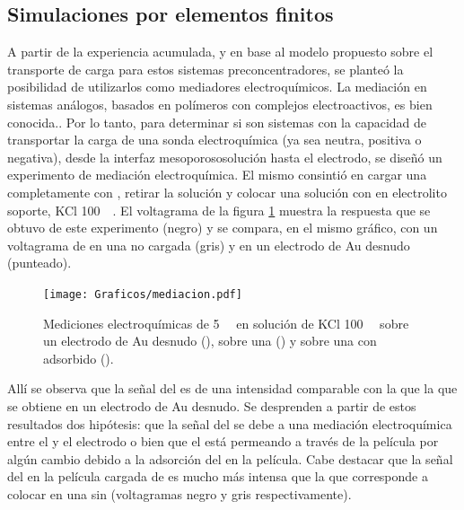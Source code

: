 	\subsection{Simulaciones por elementos finitos}	

		A partir de la experiencia acumulada, y en base al modelo propuesto sobre el transporte de carga para estos sistemas preconcentradores, se planteó la posibilidad de utilizarlos como mediadores electroquímicos. 
    	La mediación en sistemas análogos, basados en polímeros con complejos electroactivos, es bien conocida.\cite{Kolb1993,ybarra2005}. Por lo tanto, para determinar si son sistemas con la capacidad de transportar la carga de una sonda electroquímica (ya sea neutra, positiva o negativa), desde la interfaz mesoporoso\textbar solución hasta el electrodo, se diseñó un experimento de mediación electroquímica. El mismo consintió en cargar una \pdmF\space completamente con \ru, retirar la solución y colocar una solución con \fc\space en electrolito soporte, KCl \SI{100}{\milli\Molar}. El voltagrama de la figura \ref{fig:mediacion} muestra la respuesta que se obtuvo de este experimento (negro) y se compara, en el mismo gráfico, con un voltagrama de \fc\space en una \pdmF\space no cargada (gris) y en un electrodo de Au desnudo (punteado).  

        	\begin{figure}[th!]	
					\centering
			 	    \texttt{[image: Graficos/mediacion.pdf]}
			        \caption[Voltagrama de \ru\space y \fc.]{Mediciones electroquímicas de \fc\space \SI{5}{\milli\Molar} en solución de KCl \SI{100}{\milli\Molar} sobre un electrodo de Au desnudo (\usebox{\punteado}), sobre una \pdmF\space (\usebox{\gris}) y sobre una \pdmF\space con \ru\space adsorbido (\usebox{\negro}).}
			        \label{fig:mediacion}
			      	\end{figure}

		Allí se observa que la señal del \fc\space es de una intensidad comparable con la que la que se obtiene en un electrodo de Au desnudo. Se desprenden a partir de estos resultados dos hipótesis: que la señal del \fc\space se debe a una mediación electroquímica entre el \ru\space y el electrodo o bien que el \fc\space está permeando a través de la película por algún cambio debido a la adsorción del \ru\space en la película. Cabe destacar que la señal del \fc\space en la película cargada de \ru\space es mucho más intensa que la que corresponde a colocar \fc\space en una \pdmF\space sin \ru\space (voltagramas negro y gris respectivamente).

